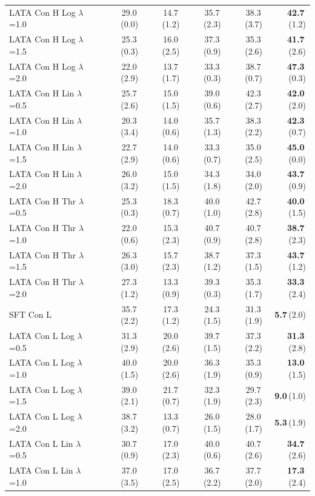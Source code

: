 \begin{longtable}{lrrrrr}
LATA Con H Log $\lambda$=1.0 & 29.0\,(0.0) & 14.7\,(1.2) & 35.7\,(2.3) & 38.3\,(3.7) & \textbf{42.7}\,(1.2) \\
LATA Con H Log $\lambda$=1.5 & 25.3\,(0.3) & 16.0\,(2.5) & 37.3\,(0.9) & 35.3\,(2.6) & \textbf{41.7}\,(2.6) \\
LATA Con H Log $\lambda$=2.0 & 22.0\,(2.9) & 13.7\,(1.7) & 33.3\,(0.3) & 38.7\,(0.7) & \textbf{47.3}\,(0.3) \\
LATA Con H Lin $\lambda$=0.5 & 25.7\,(2.6) & 15.0\,(1.5) & 39.0\,(0.6) & 42.3\,(2.7) & \textbf{42.0}\,(2.0) \\
LATA Con H Lin $\lambda$=1.0 & 20.3\,(3.4) & 14.0\,(0.6) & 35.7\,(1.3) & 38.3\,(2.2) & \textbf{42.3}\,(0.7) \\
LATA Con H Lin $\lambda$=1.5 & 22.7\,(2.9) & 14.0\,(0.6) & 33.3\,(0.7) & 35.0\,(2.5) & \textbf{45.0}\,(0.0) \\
LATA Con H Lin $\lambda$=2.0 & 26.0\,(3.2) & 15.0\,(1.5) & 34.3\,(1.8) & 34.0\,(2.0) & \textbf{43.7}\,(0.9) \\
LATA Con H Thr $\lambda$=0.5 & 25.3\,(0.3) & 18.3\,(0.7) & 40.0\,(1.0) & 42.7\,(2.8) & \textbf{40.0}\,(1.5) \\
LATA Con H Thr $\lambda$=1.0 & 22.0\,(0.6) & 15.3\,(2.3) & 40.7\,(0.9) & 40.7\,(2.8) & \textbf{38.7}\,(2.3) \\
LATA Con H Thr $\lambda$=1.5 & 26.3\,(3.0) & 15.7\,(2.3) & 38.7\,(1.2) & 37.3\,(1.5) & \textbf{43.7}\,(1.2) \\
LATA Con H Thr $\lambda$=2.0 & 27.3\,(1.2) & 13.3\,(0.9) & 39.3\,(0.3) & 35.3\,(1.7) & \textbf{33.3}\,(2.4) \\
SFT Con L & 35.7\,(2.2) & 17.3\,(1.2) & 24.3\,(1.5) & 31.3\,(1.9) & \textbf{5.7}\,(2.0) \\
LATA Con L Log $\lambda$=0.5 & 31.3\,(2.9) & 20.0\,(2.6) & 39.7\,(1.5) & 37.3\,(2.2) & \textbf{31.3}\,(2.8) \\
LATA Con L Log $\lambda$=1.0 & 40.0\,(1.5) & 20.0\,(2.6) & 36.3\,(1.9) & 35.3\,(0.9) & \textbf{13.0}\,(1.5) \\
LATA Con L Log $\lambda$=1.5 & 39.0\,(2.1) & 21.7\,(0.7) & 32.3\,(1.9) & 29.7\,(2.3) & \textbf{9.0}\,(1.0) \\
LATA Con L Log $\lambda$=2.0 & 38.7\,(3.2) & 13.3\,(0.7) & 26.0\,(1.5) & 28.0\,(1.7) & \textbf{5.3}\,(1.9) \\
LATA Con L Lin $\lambda$=0.5 & 30.7\,(0.9) & 17.0\,(2.3) & 40.0\,(0.6) & 40.7\,(2.6) & \textbf{34.7}\,(2.6) \\
LATA Con L Lin $\lambda$=1.0 & 37.0\,(3.5) & 17.0\,(2.5) & 36.7\,(2.2) & 37.7\,(2.0) & \textbf{17.3}\,(2.4) \\

\end{longtable}
